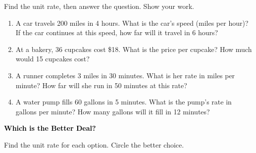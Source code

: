 \documentclass[12pt, letterpaper, fleqn]{article}
\begin{document}
\noindent
Find the unit rate, then answer the question. Show your work.

\vspace{3mm}

\begin{enumerate}[itemsep=2cm, leftmargin=0.6cm]
\item A car travels 200 miles in 4 hours. What is the car's speed (miles per hour)? If the car continues at this speed, how far will it travel in 6 hours?\\
\vspace{1cm}

\item At a bakery, 36 cupcakes cost \$18. What is the price per cupcake? How much would 15 cupcakes cost?\\
\vspace{1cm}

\item A runner completes 3 miles in 30 minutes. What is her rate in miles per minute? How far will she run in 50 minutes at this rate?\\
\vspace{1cm}

\item A water pump fills 60 gallons in 5 minutes. What is the pump's rate in gallons per minute? How many gallons will it fill in 12 minutes?\\
\vspace{1.5cm}

\end{enumerate}

\newpage

\begin{tcolorbox}[colback=customteal!20]
\large\textcolor{black}{\textbf{Which is the Better Deal?}}
\end{tcolorbox}

\noindent
Find the unit rate for each option. Circle the better choice.

\vspace{3mm}
\end{document}
